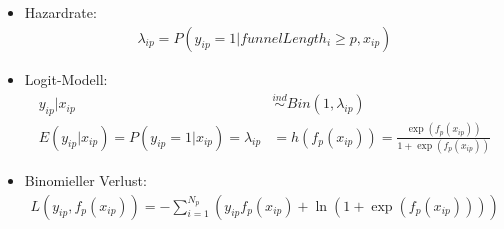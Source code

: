 \begin{frame}
	\begin{itemize}
		\item Hazardrate: 
			\begin{align*}
				\lambda_{ip} = P(y_{ip}=1|funnelLength_i \geq p, x_{ip})
			\end{align*}
		\item Logit-Modell: 
			\begin{align*}
				y_{ip}|x_{ip} &\stackrel{ind}{\sim} Bin(1, \lambda_{ip})  \\
				E(y_{ip}|x_{ip}) = P(y_{ip} = 1|x_{ip}) = \lambda_{ip} &= h(f_p(x_{ip})) = \frac{\exp(f_p(x_{ip}))}{1+\exp(f_p(x_{ip}))}
			\end{align*}
		\item Binomieller Verlust: 
			\begin{align*}
				L(y_{ip},f_p(x_{ip})) = -\sum_{i=1}^{N_p} (y_{ip} f_p(x_{ip}) + \ln(1+\exp(f_p(x_{ip}))))
			\end{align*}
	\end{itemize}
\end{frame}


